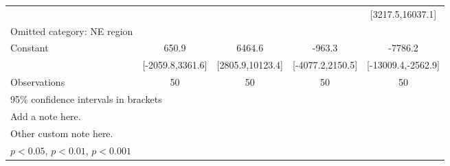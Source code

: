 {\begin{tabular}{l*{4}{c}}
                    &                               &                               &                               &      [3217.5,16037.1]         \\
[1em]
Omitted category: NE region&                               &                               &                               &                               \\
[1em]
Constant            &                 650.9         &                6464.6\sym{***}&                -963.3         &               -7786.2\sym{**} \\
                    &      [-2059.8,3361.6]         &      [2805.9,10123.4]         &      [-4077.2,2150.5]         &    [-13009.4,-2562.9]         \\
\hline
Observations        &                    50         &                    50         &                    50         &                    50         \\
\hline\hline
\multicolumn{5}{l}{\footnotesize 95\% confidence intervals in brackets}\\
\multicolumn{5}{l}{\footnotesize Add a note here.}\\
\multicolumn{5}{l}{\footnotesize Other custom note here.}\\
\multicolumn{5}{l}{\footnotesize \sym{*} \(p<0.05\), \sym{**} \(p<0.01\), \sym{***} \(p<0.001\)}\\
\end{tabular}
}
